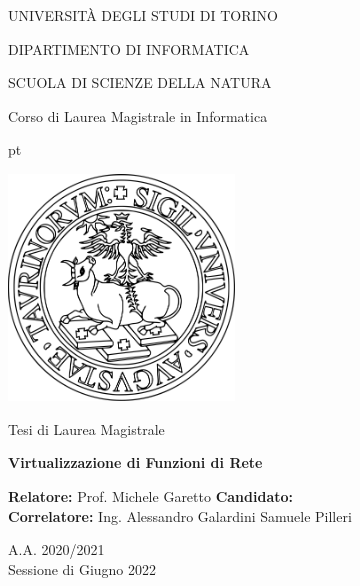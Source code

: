 \begin{titlepage}

\vspace{-12em}

\begin{addmargin}[.3cm]{.3cm}
\begin{center}

\large

{\textsc UNIVERSIT\`A DEGLI STUDI DI TORINO}

{\textsc DIPARTIMENTO DI INFORMATICA}

{\textsc SCUOLA DI SCIENZE DELLA NATURA}

{\textsc Corso di Laurea Magistrale in Informatica}


 pt

\includegraphics[width=6cm]{graphics/logo.png}

\vskip 30pt

\normalsize {Tesi di Laurea Magistrale}

\vskip 30pt

\Huge\textbf{Virtualizzazione di Funzioni di Rete}

\large

\vskip 30pt

\noindent \textbf{Relatore:} Prof. Michele Garetto
\hfill \textbf{Candidato:}
\\
\noindent \textbf{Correlatore:} Ing. Alessandro Galardini
\hfill Samuele Pilleri

\vskip 30pt


A.A. 2020/2021 \\
Sessione di Giugno 2022

\end{center}
\end{addmargin}

\end{titlepage}